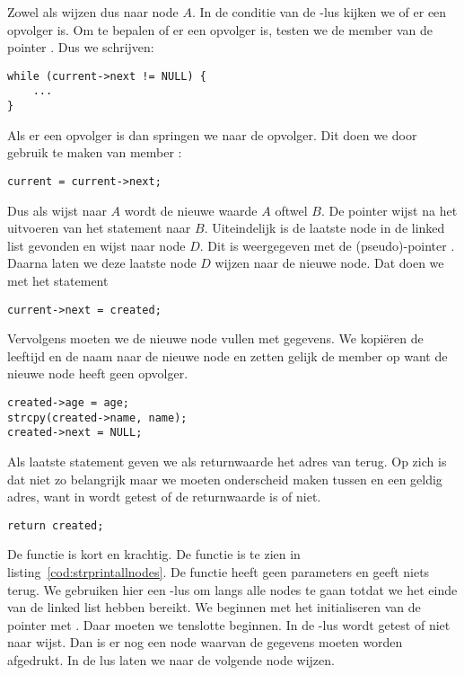 Zowel  als  wijzen dus naar node $A$. In de conditie van de -lus kijken we of er een opvolger is. Om te bepalen of er een opvolger is, testen we de member  van de pointer . Dus we schrijven:

\begin{lstlisting}[style=lstoneline]
while (current->next != NULL) {
    ...
}
\end{lstlisting}

Als er een opvolger is dan springen we naar de opvolger. Dit doen we door gebruik te maken van member :

\begin{lstlisting}[style=lstoneline]
current = current->next;
\end{lstlisting}

Dus als  wijst naar $A$ wordt de nieuwe waarde $A$ oftwel $B$.
De pointer \mbox{} wijst na het uitvoeren van het statement naar $B$. Uiteindelijk is de laatste node in de linked list gevonden en wijst  naar node $D$. Dit is weergegeven met de (pseudo)-pointer . Daarna laten we deze laatste node $D$ wijzen naar de nieuwe node. Dat doen we met het statement

\begin{lstlisting}[style=lstoneline]
current->next = created;
\end{lstlisting}

Vervolgens moeten we de nieuwe node vullen met gegevens. We kopiëren de leeftijd en de naam naar de nieuwe node en zetten gelijk de member  op  want de nieuwe node heeft geen opvolger.

\begin{lstlisting}[style=lstoneline]
created->age = age;
strcpy(created->name, name);
created->next = NULL;
\end{lstlisting}

Als laatste statement geven we als returnwaarde het adres van  terug. Op zich is dat niet zo belangrijk maar we moeten onderscheid maken tussen  en een geldig adres, want in  wordt getest of de returnwaarde  is of niet.

\begin{lstlisting}[style=lstoneline]
return created;
\end{lstlisting}

De functie  is kort en krachtig. De functie is te zien in listing~\ref{cod:strprintallnodes}. De functie heeft geen parameters en geeft niets terug.  We gebruiken hier een -lus om langs alle nodes te gaan totdat we het einde van de linked list hebben bereikt. We beginnen met het initialiseren van de pointer  met . Daar moeten we tenslotte beginnen. In de -lus wordt getest of  niet naar  wijst. Dan is er nog een node waarvan de gegevens moeten worden afgedrukt. In de lus laten we  naar de volgende node wijzen. 


